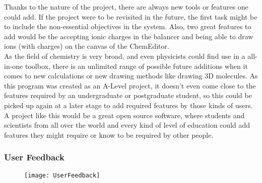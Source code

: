 \documentclass[a4paper,12pt]{article}
\begin{document}
Thanks to the nature of the project, there are always new tools or features one could add. If the project were to be revisited in the future, the first task might be to include the non-essential objectives in the system. Also, two great features to add would be the accepting ionic charges in the balancer and being able to draw ions (with charges) on the canvas of the ChemEditor.\\
As the field of chemistry is very broad, and even physicists could find use in a all-in-one toolbox, there is an unlimited range of possible future additions when it comes to new calculations or new drawing methods like drawing 3D molecules. As this program was created as an A-Level project, it doesn't even come close to the features required by an undergraduate or postgraduate student, so this could be picked up again at a later stage to add required features by those kinds of users.\\ 
A project like this would be a great open source software, where students and scientists from all over the world and every kind of level of education could add features they might require or know to be required by other people.

\subsubsection{User Feedback}

\begin{figure}[H]
	\centering
	\texttt{[image: UserFeedback]}
	\label{fig:user_feedback}
\end{figure}

\newpage

\printbibliography[heading=bibintoc]
\end{document}
